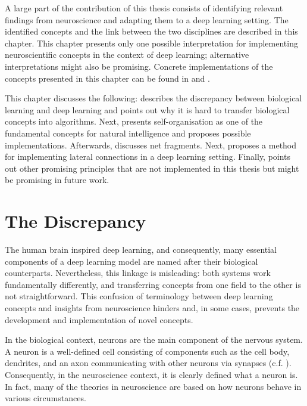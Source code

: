 A large part of the contribution of this thesis consists of identifying relevant findings from neuroscience and adapting them to a deep learning setting.
The identified concepts and the link between the two disciplines are described in this chapter.
This chapter presents only one possible interpretation for implementing neuroscientific concepts in the context of deep learning; alternative interpretations might also be promising.
Concrete implementations of the concepts presented in this chapter can be found in  and .

This chapter discusses the following:
 describes the discrepancy between biological learning and deep learning and points out why it is hard to transfer biological concepts into algorithms. Next,  presents self-organisation as one of the fundamental concepts for natural intelligence and proposes possible implementations.
Afterwards,  discusses net fragments. Next,  proposes a method for implementing lateral connections in a deep learning setting. Finally,  points out other promising principles that are not implemented in this thesis but might be promising in future work.


\section{The Discrepancy}
The human brain inspired deep learning, and consequently, many essential components of a deep learning model are named after their biological counterparts. Nevertheless, this linkage is misleading: both systems work fundamentally differently, and transferring concepts from one field to the other is not straightforward. This confusion of terminology between deep learning concepts and insights from neuroscience hinders and, in some cases, prevents the development and implementation of novel concepts. 

In the biological context, neurons are the main component of the nervous system.
A neuron is a well-defined cell consisting of components such as the cell body, dendrites, and an axon communicating with other neurons via synapses (c.f. ).
Consequently, in the neuroscience context, it is clearly defined what a neuron is. In fact, many of the theories in neuroscience are based on how neurons behave in various circumstances. 

